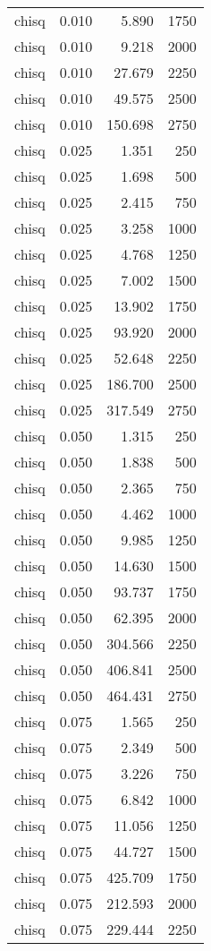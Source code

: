 \begin{table}
\begin{tabular}{lrrr}
chisq & 0.010 & 5.890 & 1750 \\
chisq & 0.010 & 9.218 & 2000 \\
chisq & 0.010 & 27.679 & 2250 \\
chisq & 0.010 & 49.575 & 2500 \\
chisq & 0.010 & 150.698 & 2750 \\
chisq & 0.025 & 1.351 & 250 \\
chisq & 0.025 & 1.698 & 500 \\
chisq & 0.025 & 2.415 & 750 \\
chisq & 0.025 & 3.258 & 1000 \\
chisq & 0.025 & 4.768 & 1250 \\
chisq & 0.025 & 7.002 & 1500 \\
chisq & 0.025 & 13.902 & 1750 \\
chisq & 0.025 & 93.920 & 2000 \\
chisq & 0.025 & 52.648 & 2250 \\
chisq & 0.025 & 186.700 & 2500 \\
chisq & 0.025 & 317.549 & 2750 \\
chisq & 0.050 & 1.315 & 250 \\
chisq & 0.050 & 1.838 & 500 \\
chisq & 0.050 & 2.365 & 750 \\
chisq & 0.050 & 4.462 & 1000 \\
chisq & 0.050 & 9.985 & 1250 \\
chisq & 0.050 & 14.630 & 1500 \\
chisq & 0.050 & 93.737 & 1750 \\
chisq & 0.050 & 62.395 & 2000 \\
chisq & 0.050 & 304.566 & 2250 \\
chisq & 0.050 & 406.841 & 2500 \\
chisq & 0.050 & 464.431 & 2750 \\
chisq & 0.075 & 1.565 & 250 \\
chisq & 0.075 & 2.349 & 500 \\
chisq & 0.075 & 3.226 & 750 \\
chisq & 0.075 & 6.842 & 1000 \\
chisq & 0.075 & 11.056 & 1250 \\
chisq & 0.075 & 44.727 & 1500 \\
chisq & 0.075 & 425.709 & 1750 \\
chisq & 0.075 & 212.593 & 2000 \\
chisq & 0.075 & 229.444 & 2250 \\

\end{tabular}
\end{table}
